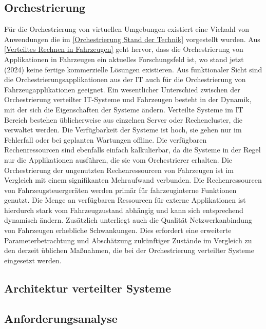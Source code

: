 \subsection{Orchestrierung}
Für die Orchestrierung von virtuellen Umgebungen existiert eine Vielzahl von Anwendungen die im \autoref{Orchestrierung Stand der Technik} vorgestellt wurden. Aus \autoref{Verteiltes Rechnen in Fahrzeugen} geht hervor, dass die Orchestrierung von Applikationen in Fahrzeugen ein aktuelles Forschungsfeld ist, wo stand jetzt (2024) keine fertige kommerzielle Lösungen existieren. Aus funktionaler Sicht sind die Orchestrierungsapplikationen aus der IT auch für die Orchestrierung von Fahrzeugapplikationen geeignet. Ein wesentlicher Unterschied zwischen der Orchestrierung verteilter IT-Systeme und Fahrzeugen besteht in der Dynamik, mit der sich die Eigenschaften der Systeme ändern. Verteilte Systeme im IT Bereich bestehen üblicherweise aus einzelnen Server oder Rechencluster, die verwaltet werden. Die Verfügbarkeit der Systeme ist hoch, sie gehen nur im Fehlerfall oder bei geplanten Wartungen offline. Die verfügbaren Rechenressourcen sind ebenfalls einfach kalkulierbar, da die Systeme in der Regel nur die Applikationen ausführen, die sie vom Orchestrierer erhalten. Die Orchestrierung der ungenutzten Rechenressourcen von Fahrzeugen ist im Vergleich mit einem signifikanten Mehraufwand verbunden. Die Rechenressourcen von Fahrzeugsteuergeräten werden primär für fahrzeuginterne Funktionen genutzt. Die Menge an verfügbaren Ressourcen für externe Applikationen ist hierdurch stark vom Fahrzeugzustand abhängig und kann sich entsprechend dynamisch ändern. Zusätzlich unterliegt auch die Qualität Netzwerkanbindung von Fahrzeugen erhebliche Schwankungen. Dies erfordert eine erweiterte Parameterbetrachtung und Abschätzung zukünftiger Zustände im Vergleich zu den derzeit üblichen Maßnahmen, die bei der Orchestrierung verteilter Systeme eingesetzt werden.
 
\subsection{Architektur verteilter Systeme}



\subsection{Anforderungsanalyse}


